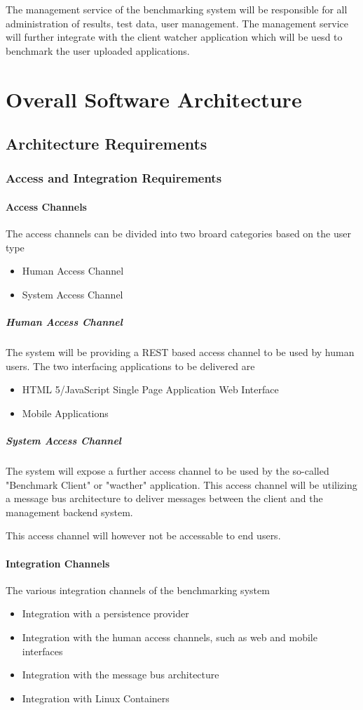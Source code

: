 The management service of the benchmarking system will be responsible for all
administration of results, test data, user management. The management service
will further integrate with the client watcher application which will be uesd to
benchmark the user uploaded applications.

\section{Overall Software Architecture}
\subsection{Architecture Requirements}
\subsubsection{Access and Integration Requirements}
\paragraph{Access Channels}
The access channels can be divided into two broard categories based on the user type
\begin{itemize}
	\item Human Access Channel
	\item System Access Channel
\end{itemize}

\subparagraph{Human Access Channel}
The system will be providing a REST based access channel to be used by human
users. The two interfacing applications to be delivered are
\begin{itemize}
	\item HTML 5/JavaScript Single Page Application Web Interface
	\item Mobile Applications
\end{itemize}

\subparagraph{System Access Channel}
The system will expose a further access channel to be used by the so-called
"Benchmark Client" or "wacther" application. This access channel will be
utilizing a message bus architecture to deliver messages between the client
and the management backend system.

This access channel will however not be accessable to end users.

\paragraph{Integration Channels}
The various integration channels of the benchmarking system
\begin{itemize}
	\item Integration with a persistence provider
	\item Integration with the human access channels, such as web and
		mobile interfaces 
	\item Integration with the message bus architecture
	\item Integration with Linux Containers
\end{itemize}


